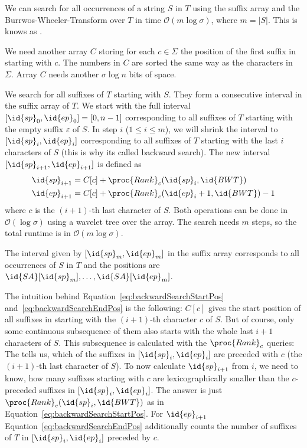 \begin{Theorem}
  We can search for all occurrences of a string $S$ in $T$ using the suffix array  and the Burrwos-Wheeler-Transform  over $T$ in time $\mathcal{O}(m\log \sigma)$, where $m = \vert S \vert$. This is knows as .
\end{Theorem}

\begin{Proof}
  We need another array $C$ storing for each $c \in \Sigma$ the position of the first suffix in~ starting with $c$. The numbers in $C$ are sorted the same way as the characters in~$\Sigma$. Array $C$ needs another $\sigma\log n$ bits of space.

  We search for all suffixes of $T$ starting with $S$. They form a consecutive interval in the suffix array  of $T$. We start with the full interval $[\id{sp}_0,\id{ep}_0]=[0,n-1]$ corresponding to all suffixes of $T$ starting with the empty suffix $\varepsilon$ of $S$. In step $i$ ($1 \leq i \leq m$), we will shrink the interval to $[\id{sp}_i,\id{ep}_i]$ corresponding to all suffixes of $T$ starting with the last $i$ characters of $S$ (this is why its called backward search). The new interval $[\id{sp}_{i+1},\id{ep}_{i+1}]$ is defined as
  \begin{align}
    \id{sp}_{i+1} &= C[c] + \proc{Rank}_c(\id{sp}_i, \id{BWT})
    \label{eq:backwardSearchStartPos} \\
    \id{ep}_{i+1} &= C[c] + \proc{Rank}_c(\id{ep}_i + 1, \id{BWT}) - 1
    \label{eq:backwardSearchEndPos}
  \end{align}
  where $c$ is the $(i+1)$-th last character of $S$. Both operations can be done in $\mathcal{O}(\log\sigma)$ using a wavelet tree over the  array. The search needs $m$ steps, so the total runtime is in $\mathcal{O}(m\log\sigma)$.

  The interval given by $[\id{sp}_m,\id{ep}_m]$ in the suffix array corresponds to all occurrences of $S$ in $T$ and the positions are $\id{SA}[\id{sp}_m], \ldots, \id{SA}[\id{ep}_m]$.
\end{Proof}

The intuition behind Equation~\ref{eq:backwardSearchStartPos} and~\ref{eq:backwardSearchEndPos} is the following: $C[c]$ gives the start position of all suffixes in  starting with the $(i+1)$-th character $c$ of $S$. But of course, only some continuous subsequence of them also starts with the whole last $i+1$ characters of $S$. This subsequence is calculated with the $\proc{Rank}_c$ queries: The  tells us, which of the suffixes in $[\id{sp}_i,\id{ep}_i]$ are preceded with $c$ (the $(i+1)$-th last character of $S$). To now calculate $\id{sp}_{i+1}$ from $i$, we need to know, how many suffixes starting with $c$ are lexicographically smaller than the $c$-preceded suffixes in $[\id{sp}_i,\id{ep}_i]$. The answer is just $\proc{Rank}_c(\id{sp}_i, \id{BWT})$ as in Equation~\ref{eq:backwardSearchStartPos}. For $\id{ep}_{i+1}$ Equation~\ref{eq:backwardSearchEndPos} additionally counts the number of suffixes of $T$ in $[\id{sp}_i,\id{ep}_i]$ preceded by $c$.

